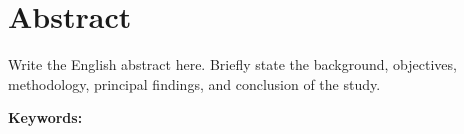 \chapter*{Abstract}

Write the English abstract here. Briefly state the background, objectives,
methodology, principal findings, and conclusion of the study.

\vspace{16pt}
\noindent\textbf{Keywords:} \keywordsEN
\clearpage
